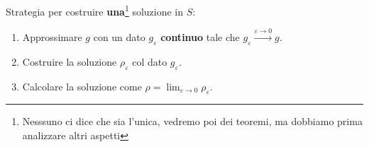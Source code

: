 \documentclass[10pt,a4paper,twoside,openright]{book}
\begin{document}
Strategia per costruire \textbf{una}\footnote{Nesssuno ci dice che sia l'unica, vedremo poi dei teoremi, ma dobbiamo prima analizzare altri aspetti} soluzione in $S$:
\begin{enumerate}
    \item Approssimare $g$ con un dato $g_{\varepsilon }$ \textbf{continuo} tale che $g_{\varepsilon }\xrightarrow{\varepsilon \rightarrow 0} g$.
    \item Costruire la soluzione $\rho _{\varepsilon }$ col dato $g_{\varepsilon }$.
    \item Calcolare la soluzione come $\rho =\lim _{\varepsilon \rightarrow 0} \rho _{\varepsilon }$.
\end{enumerate}

\end{document}
